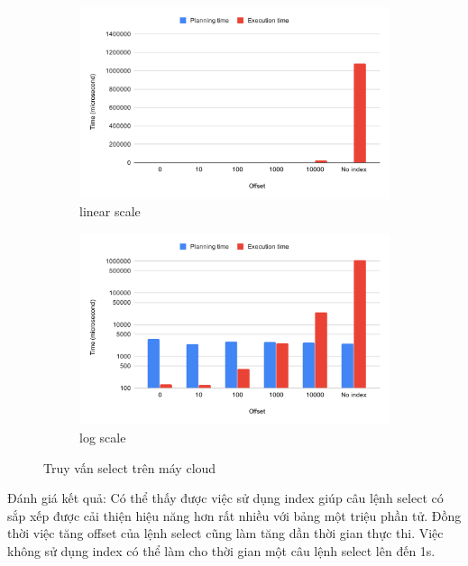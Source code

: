 \begin{figure}[H]
\centering
\begin{subfigure}{0.5\textwidth}
    \centering
    \includegraphics[width=\textwidth]{images/testing/select-cloud.png}
    \caption{linear scale}
\end{subfigure}%
\begin{subfigure}{0.5\textwidth}
    \centering
    \includegraphics[width=\textwidth]{images/testing/select-cloud-log.png}
    \caption{log scale}
\end{subfigure}
\caption{Truy vấn select trên máy cloud}
\end{figure}

Đánh giá kết quả: Có thể thấy được việc sử dụng index giúp câu lệnh
select có sắp xếp được cải thiện hiệu năng hơn rất nhiều với
bảng một triệu phần tử.
Đồng thời việc tăng offset của lệnh select cũng làm tăng dần thời gian
thực thi. Việc không sử dụng index có thể làm cho thời gian một câu lệnh
select lên đến 1s.

